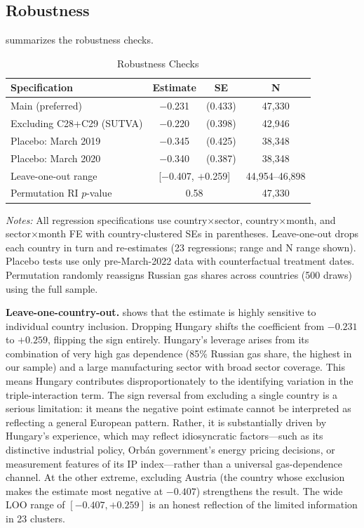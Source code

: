 \documentclass[12pt]{article}
\begin{document}
\subsection{Robustness}

 summarizes the robustness checks.

\begin{table}[H]
\centering
\caption{Robustness Checks}
\label{tab:robustness}
\begin{threeparttable}
\begin{tabular}{lccc}
\toprule
Specification & Estimate & SE & N \\
\midrule
Main (preferred) & $-$0.231 & (0.433) & 47,330 \\
Excluding C28+C29 (SUTVA) & $-$0.220 & (0.398) & 42,946 \\
Placebo: March 2019 & $-$0.345 & (0.425) & 38,348 \\
Placebo: March 2020 & $-$0.340 & (0.387) & 38,348 \\
Leave-one-out range & \multicolumn{2}{c}{[$-$0.407, $+$0.259]} & 44,954--46,898 \\
Permutation RI $p$-value & \multicolumn{2}{c}{0.58} & 47,330 \\
\bottomrule
\end{tabular}
\begin{tablenotes}[flushleft]
\small
\item \textit{Notes:} All regression specifications use country$\times$sector, country$\times$month, and sector$\times$month FE with country-clustered SEs in parentheses. Leave-one-out drops each country in turn and re-estimates (23 regressions; range and N range shown). Placebo tests use only pre-March-2022 data with counterfactual treatment dates. Permutation randomly reassigns Russian gas shares across countries (500 draws) using the full sample.
\end{tablenotes}
\end{threeparttable}
\end{table}

\textbf{Leave-one-country-out.}  shows that the estimate is highly sensitive to individual country inclusion. Dropping Hungary shifts the coefficient from $-0.231$ to $+0.259$, flipping the sign entirely. Hungary's leverage arises from its combination of very high gas dependence (85\% Russian gas share, the highest in our sample) and a large manufacturing sector with broad sector coverage. This means Hungary contributes disproportionately to the identifying variation in the triple-interaction term. The sign reversal from excluding a single country is a serious limitation: it means the negative point estimate cannot be interpreted as reflecting a general European pattern. Rather, it is substantially driven by Hungary's experience, which may reflect idiosyncratic factors---such as its distinctive industrial policy, Orb\'an government's energy pricing decisions, or measurement features of its IP index---rather than a universal gas-dependence channel. At the other extreme, excluding Austria (the country whose exclusion makes the estimate most negative at $-0.407$) strengthens the result. The wide LOO range of $[-0.407, +0.259]$ is an honest reflection of the limited information in 23 clusters.
\end{document}
